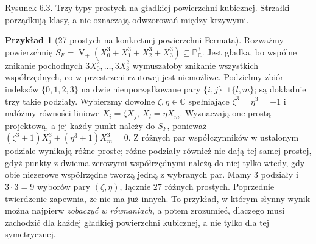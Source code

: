 \documentclass[11pt,a4paper,openany]{report}
\numberwithin{equation}{section}
\theoremstyle{plain}
\theoremstyle{definition}
\newtheorem{przyklad}[twierdzenie]{Przykład}
\theoremstyle{remark}
\newcommand{\C}{\mathbb C}
\newcommand{\PP}{\mathbb P}
\newcommand{\V}{\operatorname V}
\begin{document}
\begin{center}
\begin{minipage}{\linewidth}
\centering
{}

{\small Rysunek 6.3. Trzy typy prostych na gładkiej powierzchni kubicznej. Strzałki porządkują klasy, a nie oznaczają odwzorowań między krzywymi.}\par
\end{minipage}
\end{center}

\begin{przyklad}[27 prostych na konkretnej powierzchni Fermata]
\label{prz:ga6-fermat}
Rozważmy powierzchnię
$S_F=\V_+(X_0^3+X_1^3+X_2^3+X_3^3)\subseteq\PP^3_\C$.
Jest gładka, bo wspólne znikanie pochodnych
$3X_0^2,\ldots,3X_3^2$ wymuszałoby znikanie
wszystkich współrzędnych, co w przestrzeni rzutowej
jest niemożliwe. Podzielmy zbiór indeksów
$\{0,1,2,3\}$ na dwie nieuporządkowane pary
$\{i,j\}\sqcup\{l,m\}$; są dokładnie trzy takie
podziały. Wybierzmy dowolne $\zeta,\eta\in\C$
spełniające $\zeta^3=\eta^3=-1$ i nałóżmy
równości liniowe $X_i=\zeta X_j$,
$X_l=\eta X_m$. Wyznaczają one prostą projektową,
a jej każdy punkt należy do $S_F$, ponieważ
$(\zeta^3+1)X_j^3+(\eta^3+1)X_m^3=0$.
Z różnych par współczynników w ustalonym podziale wynikają różne proste;
różne podziały również nie dają tej samej prostej, gdyż
punkty z dwiema zerowymi współrzędnymi należą do niej tylko
wtedy, gdy obie niezerowe współrzędne tworzą jedną z wybranych par.
Mamy $3$ podziały i $3\cdot3=9$ wyborów pary
$(\zeta,\eta)$, łącznie $27$ różnych prostych.
Poprzednie twierdzenie zapewnia, że nie ma już innych.
To przykład, w którym słynny wynik można najpierw
\emph{zobaczyć w równaniach}, a potem zrozumieć,
dlaczego musi zachodzić dla każdej gładkiej powierzchni
kubicznej, a nie tylko dla tej symetrycznej.
\end{przyklad}
\end{document}
